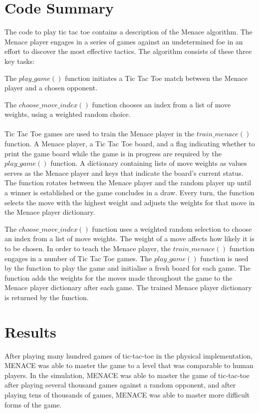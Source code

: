 \documentclass[conference]{IEEEtran}
\begin{document}
\section{Code Summary} 
The code to play tic tac toe contains a description of the Menace algorithm. The Menace player engages in a series of games against an undetermined foe in an effort to discover the most effective tactics. The algorithm consists of these three key tasks:

The $play\_game()$ function initiates a Tic Tac Toe match between the Menace player and a chosen opponent.

The $choose\_move\_index()$ function chooses an index from a list of move weights, using a weighted random choice.\\
\\

Tic Tac Toe games are used to train the Menace player in the $train\_menace()$ function. A Menace player, a Tic Tac Toe board, and a flag indicating whether to print the game board while the game is in progress are required by the $play\_game()$ function. A dictionary containing lists of move weights as values serves as the Menace player and keys that indicate the board's current status. The function rotates between the Menace player and the random player up until a winner is established or the game concludes in a draw. Every turn, the function selects the move with the highest weight and adjusts the weights for that move in the Menace player dictionary.

The $choose\_move\_index()$ function uses a weighted random selection to choose an index from a list of move weights. The weight of a move affects how likely it is to be chosen. In order to teach the Menace player, the $train\_menace()$ function engages in a number of Tic Tac Toe games. The $play\_game()$ function is used by the function to play the game and initialise a fresh board for each game. The function adds the weights for the moves made throughout the game to the Menace player dictionary after each game. The trained Menace player dictionary is returned by the function.

\section{Results}
After playing many hundred games of tic-tac-toe in the physical implementation, MENACE was able to master the game to a level that was comparable to human players. In the simulation, MENACE was able to master the game of tic-tac-toe after playing several thousand games against a random opponent, and after playing tens of thousands of games, MENACE was able to master more difficult forms of the game.\\
\end{document}
